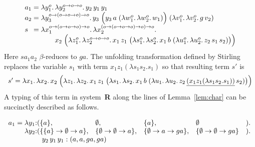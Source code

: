 \documentclass{easychair}
\theoremstyle{plain}%
\renewcommand{\:}{\mbox{:}\xspace}
\begin{document}
\begin{displaymath}
  \begin{array}{l@{\;}c@{\;}l}
    a_1 & = & \lambda y_1^{o}.\, \lambda y_2^{o \to o \to o}.\, y_2\, y_1\, y_1\\
    a_2 & = & \lambda y_3^{o \to (o \to o \to o) \to o}.\,
               y_3\;\Bigl(y_3\, a\; (\lambda w_1^{o}.\, \lambda w_2^{o}.\, w_1)\Bigr)
               \;(\lambda v_1^{o}.\, \lambda v_2^{o}.\, g\, v_2)\\
    s & = & \lambda x_1^{o \to (o \to o \to o) \to o}.\,
  \lambda x_2^{(o \to (o \to o \to o) \to o) \to o}.\,\\ & & \qquad
  x_2\;\Bigl(
    \lambda z_1^{o}.\, \lambda z_2^{o \to o \to o}.\,
    x_1\, z_1\;
    \bigl(
      \lambda s_1^{o}.\, \lambda s_2^{o}.\,
      x_1\, b\;
      (\lambda u_1^{o}.\, \lambda u_2^{o}.\,
      z_2\, s_1\, s_2)
    \bigr)
  \Bigr)
  \end{array}
\end{displaymath}
Here $sa_1a_2$ $\beta$-reduces to $ga$. The unfolding transformation defined by Stirling replaces the variable $s_1$ with term
$x_1z_1(\lambda s_1s_2.s_1)$ so that resulting term $s'$ is
\begin{displaymath}
    \begin{array}{l@{\;}c@{\;}l}
    s' & = & \lambda x_1.\,
  \lambda x_2.\,
  x_2\;\Bigl(
    \lambda z_1.\, \lambda z_2.\,
    x_1\, z_1\;
    \bigl(
      \lambda s_1.\, \lambda s_2.\,
      x_1\, b\;
      (\lambda u_1.\, \lambda u_2.\,
      z_2\, \underline{(x_1z_1(\lambda s_1s_2.s_1))}\, s_2)
    \bigr)
  \Bigr)
  \end{array}
\end{displaymath}
A typing of this term in system~\textbf{R} along the lines of Lemma~\ref{lem:char} can be succinctly described as follows.

\medskip

$
  \begin{array}{l@{\;}c@{\;}lllll}
    a_1 & = &  \lambda y_1\:(\{a\}, & \emptyset, & \{a\}, & \emptyset &).\, \\ & &
               \lambda y_2\:(\{\{a\} \to \emptyset \to a\}, & 
                            \{\emptyset \to \emptyset \to a\}, &
                            \{\emptyset \to a \to ga\}, &
                            \{\emptyset \to \emptyset \to ga\} &).\,\\ & &
                   \multicolumn{2}{l}{\qquad y_2\, y_1\, y_1 : (a,  a,  ga,  ga )}
  \end{array}
$
\end{document}
